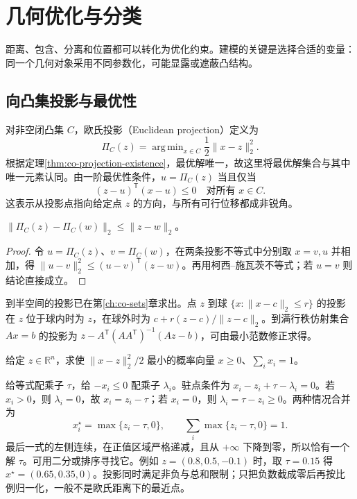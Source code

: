 \setcounter{chapter}{7} %
\chapter{几何优化与分类}
\label{ch:co-geometry}

距离、包含、分离和位置都可以转化为优化约束。建模的关键是选择合适的变量：同一个几何对象采用不同参数化，可能显露或遮蔽凸结构。

\section{向凸集投影与最优性}

对非空闭凸集 $C$，欧氏投影（Euclidean projection）定义为
\begin{equation}
 \Pi_C(z)=\mathop{\mathrm{arg\,min}}_{x\in C}\frac12\|x-z\|_2^2.
 \label{eq:co-projection}
\end{equation}
根据定理\ref{thm:co-projection-existence}，最优解唯一，故这里将最优解集合与其中唯一元素认同。由一阶最优性条件，$u=\Pi_C(z)$ 当且仅当
\[
 (z-u)^{\mathsf T}(x-u)\leq0\quad\text{对所有 }x\in C.
\]
这表示从投影点指向给定点 $z$ 的方向，与所有可行位移都成非锐角。

\begin{proposition}[投影的非扩张性]
$\|\Pi_C(z)-\Pi_C(w)\|_2\leq\|z-w\|_2$。
\end{proposition}
\begin{proof}
令 $u=\Pi_C(z)$、$v=\Pi_C(w)$，在两条投影不等式中分别取 $x=v,u$ 并相加，得 $\|u-v\|_2^2\leq(u-v)^{\mathsf T}(z-w)$。再用柯西--施瓦茨不等式；若 $u=v$ 则结论直接成立。
\end{proof}

到半空间的投影已在第\ref{ch:co-sets}章求出。点 $z$ 到球 $\{x:\|x-c\|_2\leq r\}$ 的投影在 $z$ 位于球内时为 $z$，在球外时为 $c+r(z-c)/\|z-c\|_2$。到满行秩仿射集合 $Ax=b$ 的投影为 $z-A^{\mathsf T}(AA^{\mathsf T})^{-1}(Az-b)$，可由最小范数修正求得。

\begin{example}[投影到概率单纯形]
给定 $z\in\mathbb R^n$，求使 $\|x-z\|_2^2/2$ 最小的概率向量 $x\geq0$、$\sum_i x_i=1$。
\end{example}
\begin{solve}
给等式配乘子 $\tau$，给 $-x_i\leq0$ 配乘子 $\lambda_i$。驻点条件为 $x_i-z_i+\tau-\lambda_i=0$。若 $x_i>0$，则 $\lambda_i=0$，故 $x_i=z_i-\tau$；若 $x_i=0$，则 $\lambda_i=\tau-z_i\geq0$。两种情况合并为
\begin{equation}
 x_i^\star=\max\{z_i-\tau,0\},\qquad
 \sum_i\max\{z_i-\tau,0\}=1.
 \label{eq:co-simplex-projection}
\end{equation}
最后一式的左侧连续，在正值区域严格递减，且从 $+\infty$ 下降到零，所以恰有一个解 $\tau$。可用二分或排序寻找它。例如 $z=(0.8,0.5,-0.1)$ 时，取 $\tau=0.15$ 得 $x^\star=(0.65,0.35,0)$。投影同时满足非负与总和限制；只把负数截成零后再按比例归一化，一般不是欧氏距离下的最近点。
\end{solve}

